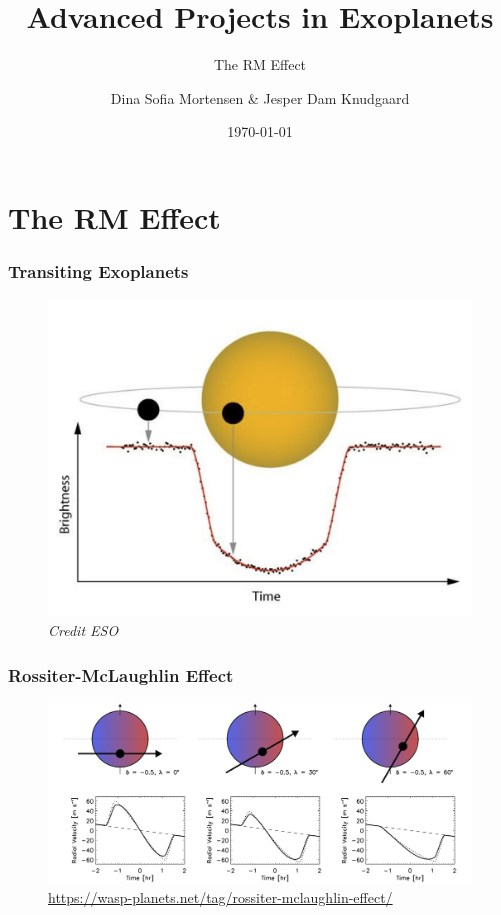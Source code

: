 \documentclass[show notes]{beamer}
\title{Advanced Projects in Exoplanets}
\subtitle{The RM Effect}
\author{Dina Sofia Mortensen \& Jesper Dam Knudgaard}
\institute{Stellar Astrophysics Centre, Aarhus University}
\date{\today}
\begin{document}
\begin{frame}
\titlepage
\end{frame}

\section{The RM Effect}

\begin{frame}
\frametitle{Transiting Exoplanets}
	\begin{figure}
		\centering
		\includegraphics[width = 0.7\columnwidth]{Transit.jpg}
		\caption{\textit{Credit ESO}}
		\label{fig:transit} 
	\end{figure}
\end{frame}

\begin{frame}
\frametitle{Rossiter-McLaughlin Effect}
	\begin{figure}
		\centering
		\includegraphics[width=\textwidth]{winnwhites.jpg}
		\caption{\url{https://wasp-planets.net/tag/rossiter-mclaughlin-effect/}}
		\label{fig:rm_effect}
	\end{figure}
\end{frame}

\end{document}
